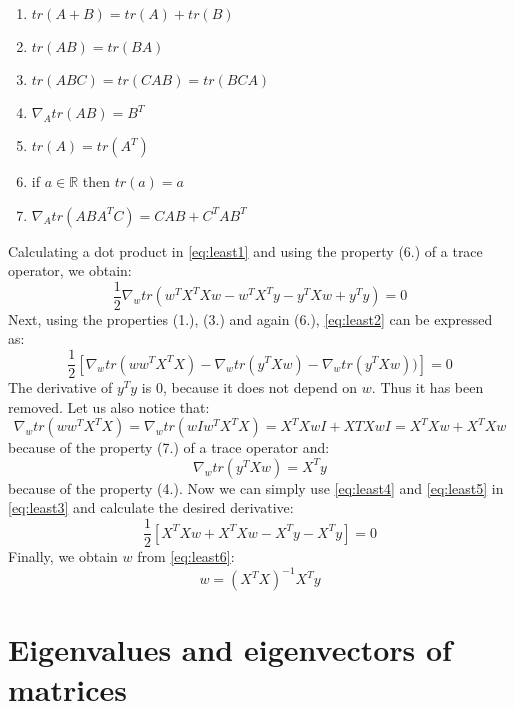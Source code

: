 \begin{appendices}
\begin{enumerate}
    \item $tr(A+B) = tr(A)+tr(B)$
    \item $tr(AB) = tr(BA)$
    \item $tr(ABC) = tr(CAB) = tr(BCA)$
    \item $\nabla_Atr(AB) = B^T$
    \item $tr(A)=tr(A^T)$
    \item if $a \in \mathbb{R}$ then $tr(a)=a$
    \item $\nabla_Atr(ABA^TC) = CAB+C^TAB^T$
\end{enumerate}
Calculating a dot product in \cref{eq:least1} and using the property (6.) of a trace operator, we obtain:
\begin{equation}\label{eq:least2}
    \frac{1}{2} \nabla_w tr(w^TX^TXw-w^TX^Ty-y^TXw+y^Ty) = 0
\end{equation}
Next, using the properties (1.), (3.) and again (6.), \cref{eq:least2} can be expressed as:
\begin{equation}\label{eq:least3}
    \frac{1}{2}[\nabla_wtr(ww^TX^TX)-\nabla_wtr(y^TXw)-\nabla_wtr(y^TXw))] = 0
\end{equation}
The derivative of $y^Ty$ is $0$, because it does not depend on $w$. Thus it has been removed. Let us also notice that:
\begin{equation}\label{eq:least4}
    \nabla_wtr(ww^TX^TX) = \nabla_wtr(wIw^TX^TX) = X^TXwI + XTXwI = X^TXw+X^TXw
\end{equation}
because of the property (7.) of a trace operator and:
\begin{equation}\label{eq:least5}
    \nabla_wtr(y^TXw) = X^Ty
\end{equation}
because of the property (4.).
Now we can simply use \cref{eq:least4} and \cref{eq:least5} in \cref{eq:least3} and calculate the desired derivative:
\begin{equation}\label{eq:least6}
    \frac{1}{2}[X^TXw+X^TXw-X^Ty-X^Ty] = 0
\end{equation}
Finally, we obtain $w$ from \cref{eq:least6}:
\begin{equation}
    w=(X^TX)^{-1}X^Ty
\end{equation}

\newpage
\section{Eigenvalues and eigenvectors of matrices}
\label{app:eigen}


\end{appendices}
